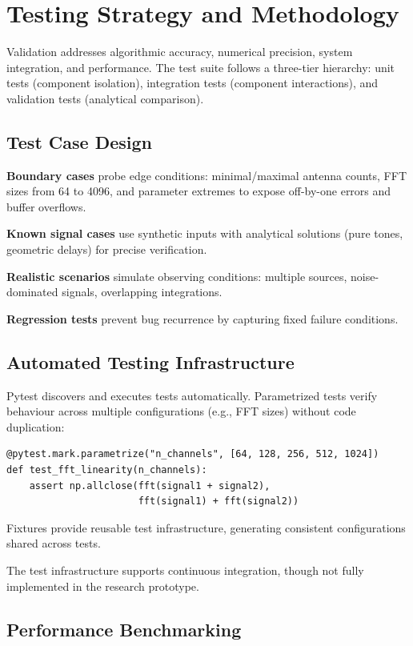 \section{Testing Strategy and Methodology}

Validation addresses algorithmic accuracy, numerical precision, system integration, and performance. The test suite follows a three-tier hierarchy: unit tests (component isolation), integration tests (component interactions), and validation tests (analytical comparison).

\subsection{Test Case Design}

\textbf{Boundary cases} probe edge conditions: minimal/maximal antenna counts, FFT sizes from 64 to 4096, and parameter extremes to expose off-by-one errors and buffer overflows.

\textbf{Known signal cases} use synthetic inputs with analytical solutions (pure tones, geometric delays) for precise verification.

\textbf{Realistic scenarios} simulate observing conditions: multiple sources, noise-dominated signals, overlapping integrations.

\textbf{Regression tests} prevent bug recurrence by capturing fixed failure conditions.

\subsection{Automated Testing Infrastructure}

Pytest discovers and executes tests automatically. Parametrized tests verify behaviour across multiple configurations (e.g., FFT sizes) without code duplication:

\begin{verbatim}
@pytest.mark.parametrize("n_channels", [64, 128, 256, 512, 1024])
def test_fft_linearity(n_channels):
    assert np.allclose(fft(signal1 + signal2), 
                       fft(signal1) + fft(signal2))
\end{verbatim}

Fixtures provide reusable test infrastructure, generating consistent configurations shared across tests.

The test infrastructure supports continuous integration, though not fully implemented in the research prototype.

\subsection{Performance Benchmarking}

